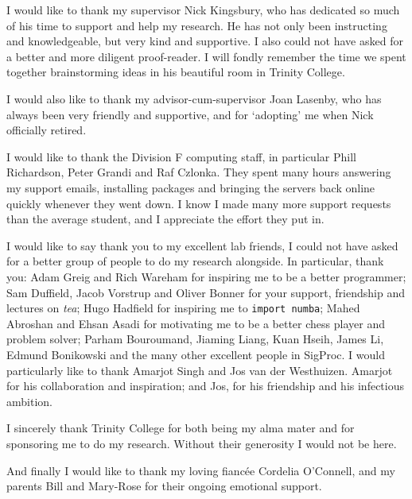 
\begin{acknowledgements}

  I would like to thank my supervisor Nick Kingsbury, who has dedicated so
  much of his time to support and help my research. He has not only been instructing and
  knowledgeable, but very kind and supportive. I also could not have asked for a
  better and more diligent proof-reader. I will fondly remember the time
  we spent together brainstorming ideas in his beautiful room in Trinity
  College.
  
  I would also like to thank my advisor-cum-supervisor Joan Lasenby, who has always
  been very friendly and supportive, and for `adopting' me when Nick officially
  retired.

  I would like to thank the Division F computing staff, in particular Phill
  Richardson, Peter Grandi and Raf Czlonka. They spent many hours answering my
  support emails, installing packages and bringing
  the servers back online quickly whenever they went down. I know I made many
  more support requests than the average student, and I appreciate the effort
  they put in.

  I would like to say thank you to my excellent lab friends, I could not have asked for a better group of
  people to do my research alongside. In particular, thank you: Adam Greig and Rich Wareham
  for inspiring me to be a better programmer; Sam Duffield, Jacob Vorstrup and Oliver Bonner 
  for your support, friendship and lectures on \emph{tea}; Hugo Hadfield for inspiring me to 
  \texttt{import numba}; Mahed Abroshan and Ehsan Asadi for
  motivating me to be a better chess player and problem solver; Parham Bouroumand, 
  Jiaming Liang, Kuan Hseih, James Li, Edmund Bonikowski and the many other
  excellent people in SigProc. I would particularly like to thank Amarjot Singh
  and Jos van der Westhuizen. Amarjot for his collaboration and inspiration; and Jos, 
  for his friendship and his infectious ambition.
  
  I sincerely thank Trinity College for both being my alma mater and
  for sponsoring me to do my research. Without their generosity I would not be
  here.

  And finally I would like to thank my loving fianc\'ee Cordelia O'Connell, and my parents
  Bill and Mary-Rose for their ongoing emotional support.
\end{acknowledgements}
